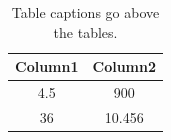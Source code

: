 \documentclass[nosmallcaps]{csuthesis}
\begin{document}
\begin{table}[htbp]
\caption{Table captions go above the tables.} \label{table1}
\begin{tabular}{|c| c|}
\hline
Column1 & Column2 \\
\hline
4.5 & 900 \\
36 & 10.456 \\
\hline
\end{tabular}
\end{table}

\lipsum[6-8]


\FloatBarrier %

\newpage


\end{document}
